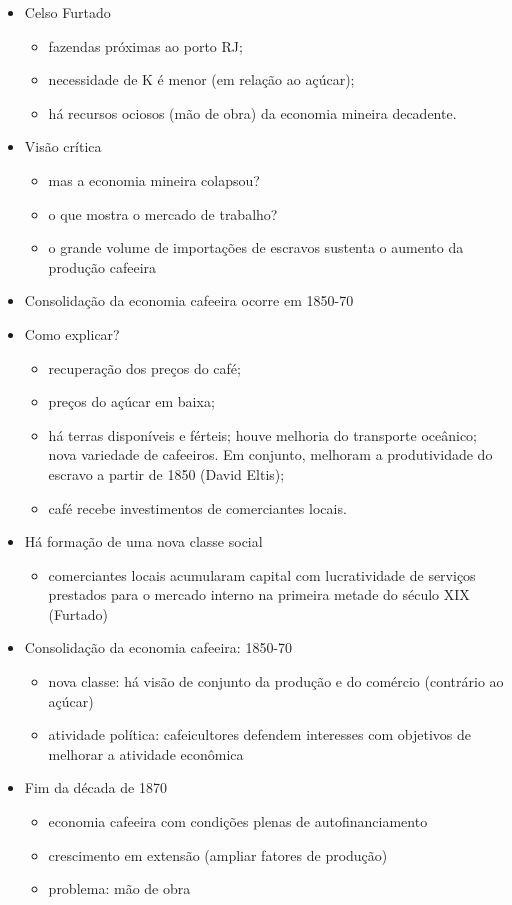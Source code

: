\documentclass[a4paper,12pt]{article}[abntex2]
\begin{document}
\begin{itemize}
    \item Celso Furtado 
    \begin{itemize}
        \item fazendas próximas ao porto RJ;
        \item necessidade de K é menor (em relação ao açúcar);
        \item há recursos ociosos (mão de obra) da economia mineira decadente.
    \end{itemize}
    \item Visão crítica 
    \begin{itemize}
        \item mas a economia mineira colapsou?
        \item o que mostra o mercado de trabalho?
        \item o grande volume de importações de escravos sustenta o aumento da produção cafeeira
    \end{itemize}
\item Consolidação da economia cafeeira ocorre em 1850-70
\item Como explicar? 
\begin{itemize}
    \item recuperação dos preços do café;
    \item preços do açúcar em baixa;
    \item há terras disponíveis e férteis; houve melhoria do transporte oceânico; nova variedade de cafeeiros. Em conjunto, melhoram a produtividade do escravo a partir de 1850 (David Eltis);
    \item café recebe investimentos de comerciantes locais.
\end{itemize}
\item Há formação de uma nova classe social 
\begin{itemize}
    \item comerciantes locais acumularam capital com lucratividade de serviços prestados para o mercado interno na primeira metade do século XIX (Furtado)
\end{itemize}
\item Consolidação da economia cafeeira: 1850-70 
\begin{itemize}
    \item nova classe: há visão de conjunto da produção e do comércio (contrário ao açúcar)
    \item atividade política: cafeicultores defendem interesses com objetivos de melhorar a atividade econômica
\end{itemize}
\item Fim da década de 1870 
\begin{itemize}
    \item economia cafeeira com condições plenas de autofinanciamento
    \item crescimento em extensão (ampliar fatores de produção)
    \item problema: mão de obra
\end{itemize}
\end{itemize}
\end{document}
